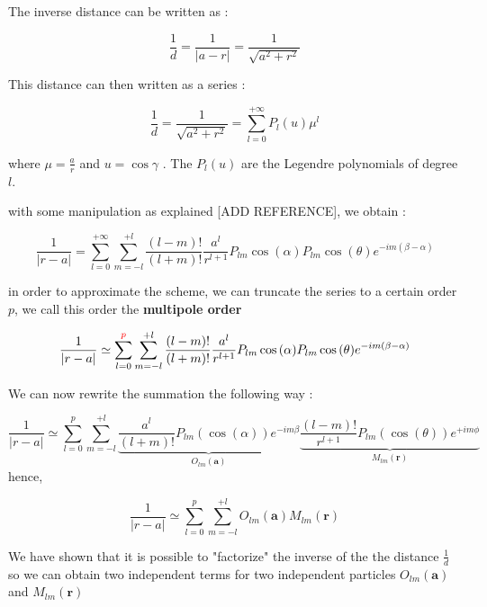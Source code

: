 \documentclass[12pt,twoside,a4paper]{report}
\begin{document}
	The inverse distance can be written as :
	
	\begin{equation*}
		\frac{1}{d} = \frac{1}{|a-r|} = \frac{1}{\sqrt{a^2 + r^2}}
	\end{equation*}

	This distance can then written as a series :
	
	\begin{equation}
		\frac{1}{d} = \frac{1}{\sqrt{a^2 + r^2}} = \sum\limits_{l=0}^{+\infty} P_l(u)\mu^l
	\end{equation}
	
	
	where $\mu = \frac{a}{r}$ and $u = \cos{\gamma}$ . The $P_l(u)$ are the Legendre polynomials of degree $l$.
	
	with some manipulation as explained [ADD REFERENCE], we obtain : 
	
	\begin{equation}
	\frac{1}{|r - a|} = \sum\limits_{l=0}^{+\infty} \sum\limits_{m = -l}^{+l} \frac{(l-m)!}{(l+m)!} \frac{a^l}{r^{l+1}} P_{lm}\cos{(\alpha)}P_{lm}\cos{(\theta)}e^{-im(\beta - \alpha)}
	\end{equation}
	
	in order to approximate the scheme, we can truncate the series to a certain order $p$, we call this order the \textbf{multipole order}
	
	\begin{equation}
	\frac{1}{|r - a|} \simeq \sum\limits_{l=0}^{\textcolor{red}{p}} \sum\limits_{m = -l}^{+l} \frac{(l-m)!}{(l+m)!} \frac{a^l}{r^{l+1}} P_{lm}\cos{(\alpha)}P_{lm}\cos{(\theta)}e^{-im(\beta - \alpha)}
	\end{equation}
	
	We can now rewrite the summation the following way :
	
		\begin{equation}
	\frac{1}{|r - a|} \simeq \sum\limits_{l=0}^{p} \sum\limits_{m = -l}^{+l}
	\underbrace{\frac{a^l}{(l+m)!} P_{lm}(\cos(\alpha))e^{-im\beta}} _{O_{lm}(\textbf{a})}
    \underbrace{\frac{(l-m)!}{r^{l+1}} P_{lm}(\cos(\theta))e^{+im\phi}} _{M_{lm}(\textbf{r})}
	\end{equation}
	hence,
	
		\begin{equation}
	\frac{1}{|r - a|} \simeq \sum\limits_{l=0}^{p} \sum\limits_{m = -l}^{+l}
	{O_{lm}(\textbf{a})}
    {M_{lm}(\textbf{r})}
	\end{equation}
	
	
	We have shown that it is possible to "factorize" the inverse of the the distance $\frac{1}{d}$ so we can obtain two independent terms for two independent particles ${O_{lm}(\textbf{a})}$ and ${M_{lm}(\textbf{r})}$ 
\end{document}
